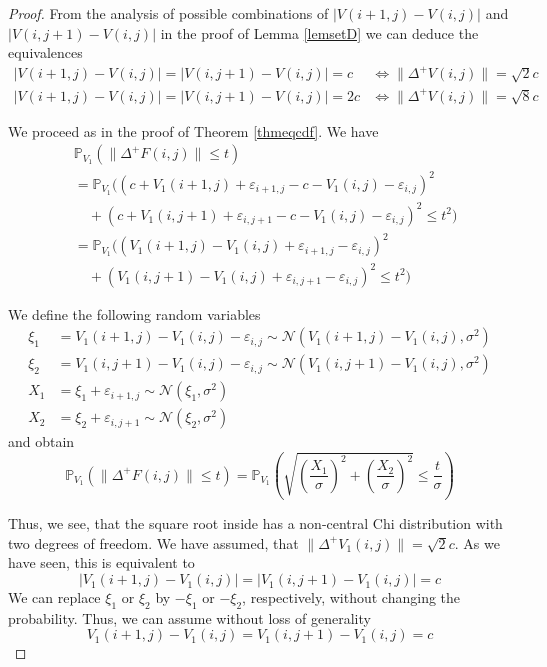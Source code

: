 \documentclass[a4paper,12pt]{article}
\newcommand{\abs}[1]{\lvert#1\rvert}
\newcommand{\norm}[1]{\lVert#1\rVert}
\theoremstyle{plain}
\theoremstyle{definition}
\begin{document}
\begin{proof}
	From the analysis of possible combinations of $\abs{V(i + 1, j) - V(i, j)}$ and $\abs{V(i, j + 1) - V(i, j)}$ in the proof of Lemma \ref{lemsetD} we can deduce the equivalences
	\begin{align*}
		\abs{V(i + 1, j) - V(i, j)} = \abs{V(i, j + 1) - V(i, j)} = c &\Leftrightarrow \norm{\Delta^+ V(i, j)} = \sqrt{2} c \\
		\abs{V(i + 1, j) - V(i, j)} = \abs{V(i, j + 1) - V(i, j)} = 2 c &\Leftrightarrow \norm{\Delta^+ V(i, j)} = \sqrt{8} c
	\end{align*}
	
	We proceed as in the proof of Theorem \ref{thmeqcdf}. We have
	\begin{align*}
		&\mathbb{P}_{V_1}( \norm{\Delta^+ F(i, j)} \leq t ) \\
		&= \mathbb{P}_{V_1}\big( (c + V_1(i + 1, j) + \varepsilon_{i + 1, j} - c - V_1(i, j) - \varepsilon_{i, j})^2 \\
		&\quad + (c + V_1(i, j + 1) + \varepsilon_{i, j + 1} - c - V_1(i, j) - \varepsilon_{i, j})^2 \leq t^2 \big) \\
		&= \mathbb{P}_{V_1}\big( (V_1(i + 1, j) - V_1(i, j) + \varepsilon_{i + 1, j} - \varepsilon_{i, j})^2 \\
		&\quad + (V_1(i, j + 1) - V_1(i, j) + \varepsilon_{i, j + 1} - \varepsilon_{i, j})^2 \leq t^2 \big)
	\end{align*}
	
	We define the following random variables
	\begin{align*}
		\xi_1 &= V_1(i + 1, j) - V_1(i, j) - \varepsilon_{i, j} \sim \mathcal{N}(V_1(i + 1, j) - V_1(i, j), \sigma^2) \\
		\xi_2 &= V_1(i, j + 1) - V_1(i, j) - \varepsilon_{i, j} \sim \mathcal{N}(V_1(i, j + 1) - V_1(i, j), \sigma^2) \\
		X_1 &= \xi_1 + \varepsilon_{i + 1, j} \sim \mathcal{N}(\xi_1, \sigma^2) \\
		X_2 &= \xi_2 + \varepsilon_{i, j + 1} \sim \mathcal{N}(\xi_2, \sigma^2)
	\end{align*}
	and obtain
	\begin{equation*}
		\mathbb{P}_{V_1}( \norm{\Delta^+ F(i, j)} \leq t ) = \mathbb{P}_{V_1}\left( \sqrt{\left( \frac{X_1}{\sigma} \right)^2 + \left( \frac{X_2}{\sigma} \right)^2} \leq \frac{t}{\sigma} \right)
	\end{equation*}
	
	Thus, we see, that the square root inside has a non-central Chi distribution with two degrees of freedom. We have assumed, that $\norm{\Delta^+ V_1(i, j)} = \sqrt{2} c$. As we have seen, this is equivalent to
	\begin{equation*}
		\abs{V_1(i + 1, j) - V_1(i, j)} = \abs{V_1(i, j + 1) - V_1(i, j)} = c
	\end{equation*}
	We can replace $\xi_1$ or $\xi_2$ by $- \xi_1$ or $- \xi_2$, respectively, without changing the probability. Thus, we can assume without loss of generality
	\begin{equation*}
		V_1(i + 1, j) - V_1(i, j) = V_1(i, j + 1) - V_1(i, j) = c
	\end{equation*}
	

\end{proof}
\end{document}
